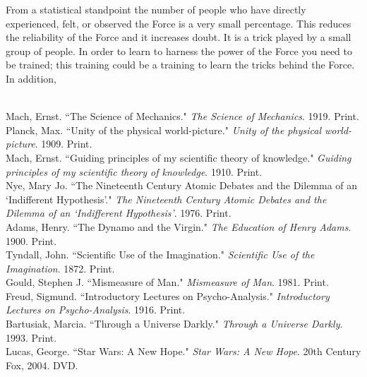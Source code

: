 \documentclass[11pt, oneside]{article}
\begin{document}
\par From a statistical standpoint the number of people who have directly experienced, felt, or observed the Force is a very small percentage. This reduces the reliability of the Force and it increases doubt. It is a trick played by a small group of people. In order to learn to harness the power of the Force you need to be trained; this training could be a training to learn the tricks behind the Force. In addition,

\begin{workscited}
\bibent \\
\bibent Mach, Ernst. ``The Science of Mechanics."  \textit{The Science of Mechanics}.  1919. Print. \\
\bibent Planck, Max. ``Unity of the physical world-picture."  \textit{Unity of the physical world-picture}.  1909. Print. \\
\bibent Mach, Ernst. ``Guiding principles of my scientific theory of knowledge."  \textit{Guiding principles of my scientific theory of knowledge}.  1910. Print. \\
\bibent Nye, Mary Jo. ``The Nineteenth Century Atomic Debates and the Dilemma of an `Indifferent Hypothesis'."  \textit{The Nineteenth Century Atomic Debates and the Dilemma of an `Indifferent Hypothesis'}.  1976. Print. \\
\bibent Adams, Henry.  ``The Dynamo and the Virgin."  \textit{The Education of Henry Adams}.  1900. Print. \\
\bibent Tyndall, John.  ``Scientific Use of the Imagination."  \textit{Scientific Use of the Imagination}.  1872. Print. \\
\bibent Gould, Stephen J.  ``Mismeasure of Man."  \textit{Mismeasure of Man}.  1981. Print. \\
\bibent Freud, Sigmund.  ``Introductory Lectures on Psycho-Analysis."  \textit{Introductory Lectures on Psycho-Analysis}.  1916. Print. \\
\bibent Bartusiak, Marcia.  ``Through a Universe Darkly."  \textit{Through a Universe Darkly}.  1993. Print. \\
\bibent Lucas, George. ``Star Wars: A New Hope."   \textit{Star Wars: A New Hope}. 20th Century Fox, 2004. DVD.
\end{workscited}
\end{document}
